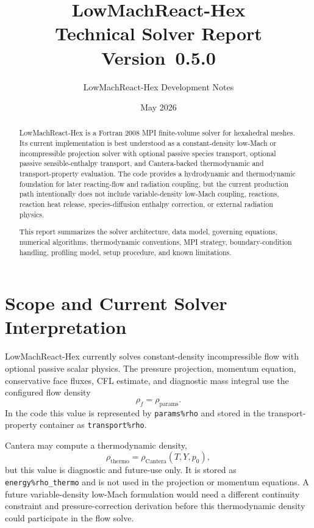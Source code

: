 \documentclass[11pt]{article}
\title{\textbf{LowMachReact-Hex}\\[0.4em]\large Technical Solver Report\\[0.2em]\normalsize Version~0.5.0}
\author{LowMachReact-Hex Development Notes}
\date{May 2026}
\begin{document}
\maketitle

\begin{abstract}
LowMachReact-Hex is a Fortran 2008 MPI finite-volume solver for hexahedral
meshes.  Its current implementation is best understood as a constant-density
low-Mach or incompressible projection solver with optional passive species
transport, optional passive sensible-enthalpy transport, and Cantera-backed
thermodynamic and transport-property evaluation.  The code provides a
hydrodynamic and thermodynamic foundation for later reacting-flow and radiation
coupling, but the current production path intentionally does not include
variable-density low-Mach coupling, reactions, reaction heat release,
species-diffusion enthalpy correction, or external radiation physics.

This report summarizes the solver architecture, data model, governing
equations, numerical algorithms, thermodynamic conventions, MPI strategy,
boundary-condition handling, profiling model, setup procedure, and known
limitations.
\end{abstract}

\tableofcontents

\section{Scope and Current Solver Interpretation}

LowMachReact-Hex currently solves constant-density incompressible flow with
optional passive scalar physics.  The pressure projection, momentum equation,
conservative face fluxes, CFL estimate, and diagnostic mass integral use the
configured flow density
\begin{equation}
  \rho_f = \rho_{\mathrm{params}}.
\end{equation}
In the code this value is represented by \texttt{params\%rho} and stored in the
transport-property container as \texttt{transport\%rho}.

Cantera may compute a thermodynamic density,
\begin{equation}
  \rho_{\mathrm{thermo}} = \rho_{\mathrm{Cantera}}(T,Y,p_0),
\end{equation}
but this value is diagnostic and future-use only.  It is stored as
\texttt{energy\%rho\_thermo} and is not used in the projection or momentum
equations.  A future variable-density low-Mach formulation would need a
different continuity constraint and pressure-correction derivation before this
thermodynamic density could participate in the flow solve.
\end{document}
